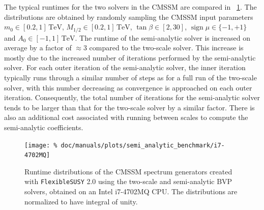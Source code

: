 \documentclass[final,3p,11pt,pdflatex]{elsarticle}
\makeatletter
\newcommand{\fs}{\texttt{FlexibleSUSY}\@\xspace}
\newcommand{\fstwo}{\fs 2.0\@\xspace}
\newcommand{\unit}[1]{\,\text{#1}}      %
\newcommand{\figref}[1]{\figurename~\ref{#1}}
\newcommand{\azero}{\ensuremath{A_0}\xspace}
\newcommand{\mhalf}{\ensuremath{M_{1/2}}\xspace}
\newcommand{\mzero}{\ensuremath{m_0}\xspace}
\DeclareMathOperator{\sign}{sign}
\makeatother
\begin{document}
The typical runtimes for the two solvers in the CMSSM are compared in
\figref{fig:semi_analytic_benchmark}.  The distributions are obtained
by randomly sampling the CMSSM input parameters
$\mzero\in [0.2,1]\unit{TeV}$, $\mhalf\in [0.2,1]\unit{TeV}$,
$\tan\beta\in [2,30]$, $\sign\mu\in\{-1,+1\}$ and
$\azero\in [-1,1]\unit{TeV}$.
The runtime of the semi-analytic solver is increased on average by a factor of
$\approx 3$ compared to the two-scale solver.  This increase is
mostly due to the increased number of iterations performed by the semi-analytic
solver.  For each outer iteration of the semi-analytic solver, the inner
iteration typically runs through a similar number of steps as for a full run
of the two-scale solver, with this number decreasing as convergence is
approached on each outer iteration.  Consequently, the total number of
iterations for the semi-analytic solver tends to be larger than that for the
two-scale solver by a similar factor.  There is also an additional cost
associated with running between scales to compute the semi-analytic
coefficients.
%
\begin{figure}[tbh]
  \centering
  \texttt{[image: \%
    doc/manuals/plots/semi\_analytic\_benchmark/i7-4702MQ]}
  \caption{Runtime distributions of the CMSSM spectrum generators created with
    \fstwo using the two-scale and semi-analytic BVP solvers, obtained on
    an Intel i7-4702MQ CPU\@.  The distributions are normalized to have integral
    of unity.}
\label{fig:semi_analytic_benchmark}
\end{figure}
\end{document}

